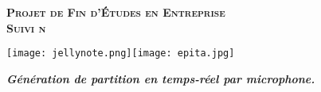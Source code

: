 \begin{titlepage}

	\flushleft{
		\textit{
			\today
		}
	}


	\begin{center}

		{
			\Huge
				\textsc{
					\textbf{
						Projet de Fin d'Études en Entreprise \\
					}
				}
		}
		{
			\LARGE
				\textsc{
					\textbf{
						Suivi n \\
					}
				}
		}

		{
				\texttt{[image: jellynote.png]}\hspace{3cm}\texttt{[image: epita.jpg]}\\
				[1cm]
		}

		\textbf{
			\textit {
				Génération de partition en temps-réel par microphone.\\
				[1cm]
			}
		}
	\end{center}
\end{titlepage}